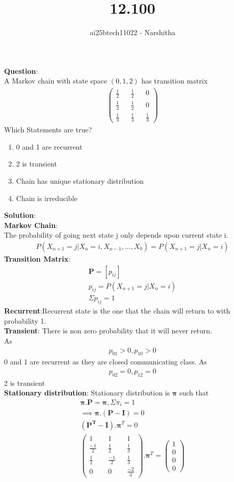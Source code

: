 \documentclass{beamer}
\title{12.100}
\author{ai25btech11022 - Narshitha}
\providecommand{\brak}[1]{\ensuremath{\left(#1\right)}}
\theoremstyle{remark}
\newcommand{\myvec}[1]{\ensuremath{\begin{pmatrix}#1\end{pmatrix}}}
\let\vec\mathbf
\numberwithin{equation}{section}
\begin{document}
{\let\newpage\relax\maketitle}
\renewcommand{\thefigure}{\theenumi}
\renewcommand{\thetable}{\theenumi} 
\textbf{Question}:\\
A Markov chain with state space \brak{0,1,2} has transition matrix \\
\begin{align}
    \myvec{\frac{1}{2} && \frac{1}{2} && 0\\\frac{1}{2} && \frac{1}{2} && 0 \\ \frac{1}{3}&& \frac{1}{3}&&\frac{1}{3}}
\end{align}
Which Statements are true?
\begin{enumerate}
    \item 0 and 1 are recurrent
    \item 2 is transient
    \item Chain has unique stationary distribution
    \item Chain is irreducible
\end{enumerate}
\textbf{Solution}:\\
\textbf{Markov Chain}:\\
The probability of going next state j  only depends upon current state i.
\begin{align}
    P\brak{X_{n+1} =j|X_n=i,X_{n-1},...,X_0}=P\brak{X_{n+1} =j|X_n=i}
\end{align}
\textbf{Transition Matrix}:
\begin{align}
\vec{P}=[ p_{ij}]\\
p_{ij}=P\brak{X_{n+1}=j|X_n =i}\\
\Sigma p_{ij} =1
\end{align}
\textbf{Recurrent}:Recurrent state is the one that the chain will return to with probability 1.\\
\textbf{Transient}: There is non zero probability that it will never return.\\
As \begin{align}
    p_{01} >0 ,p_{10}>0
\end{align} 0 and 1 are recurrent as they are closed communicating class.
As
\begin{align}
    p_{02}=0,p_{12}=0
\end{align} 2 is transient\\
\textbf{Stationary distribution}: Stationary distribution  is $\vec{\pi}$ such that
\begin{align}
    \vec{\pi}.\vec{P}=\vec{\pi} ,\Sigma \pi_i=1\\
    \implies  \vec{\pi}.\brak{\vec{P-I}}=0\\
    \brak{\vec{P^T-I}}.\vec{\pi}^T =0\\
    \myvec{1 &&1&&1\\\frac{-1}{2}&&\frac{1}{2}&& \frac{1}{3}\\\frac{1}{2} && \frac{-1}{2}&& \frac{1}{3}\\0 && 0&& \frac{-2}{3}}.\vec{\pi}^T =\myvec{1\\0\\0\\0}
\end{align}
\end{document}
